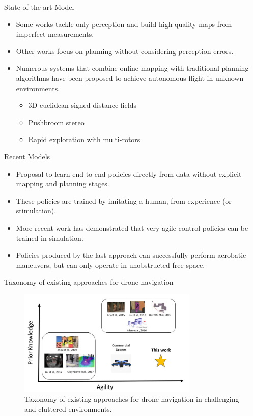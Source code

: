 \documentclass{beamer}
\begin{document}
\begin{frame}{State of the art Model}
	\begin{itemize}
		\item Some works tackle only perception and build high-quality maps from imperfect measurements. 
		\item Other works focus on planning without considering perception errors. 
		\item Numerous systems that combine online mapping with traditional planning algorithms have been proposed to achieve autonomous flight in unknown environments.
		\begin{itemize}
			\item 3D euclidean signed distance fields
			\item Pushbroom stereo
			\item Rapid exploration with multi-rotors
		\end{itemize} 
	\end{itemize}
\end{frame}

\begin{frame}{Recent Models}
	\begin{itemize}
		\item Proposal to learn end-to-end policies directly from data without explicit mapping and planning stages. 
		\item These policies are trained by imitating a human, from experience (or stimulation). 
		\item More recent work has demonstrated that very agile control policies can be trained in simulation. 
		\item Policies produced by the last approach can successfully perform acrobatic maneuvers, but can only operate in unobstructed free space.
	\end{itemize}
\end{frame}

\begin{frame}{Taxonomy of existing approaches for drone navigation}
	\centering
	\begin{figure}
		\includegraphics[height=2in]{images/taxonomy_navigation.png}
		\caption{Taxonomy of existing approaches for drone navigation in challenging and cluttered environments.}
	\end{figure}
\end{frame}
\end{document}
